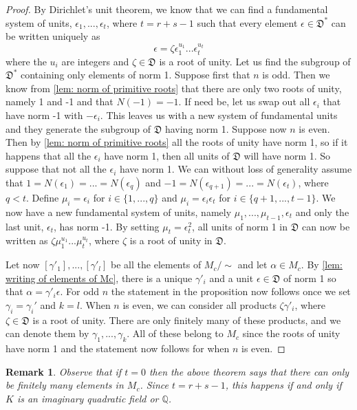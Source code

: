 \documentclass{article}
\newtheorem{remark}{Remark}[section]
\newcommand{\mfrak}[1]{\mathfrak{#1}}
\newcommand{\mbb}[1]{\mathbb{#1}}
\begin{document}
\begin{proof}
    By Dirichlet's unit theorem, we know that we can find a fundamental system of units, $\epsilon_1, ..., \epsilon_t$, where $t = r+s-1$ such that every element $\epsilon \in \mfrak D^*$ can be written uniquely as 
    $$\epsilon = \zeta \epsilon_1^{u_1} ... \epsilon_t^{u_t}$$
    where the $u_i$ are integers and $\zeta \in \mfrak D$ is a root of unity. Let us find the subgroup of $\mfrak D^*$ containing only elements of norm 1. Suppose first that $n$ is odd. Then we know from \cref{lem: norm of primitive roots} that there are only two roots of unity, namely 1 and -1 and that $N(-1) = -1$. If need be, let us swap out all $\epsilon_i$ that have norm -1 with $-\epsilon_i$. This leaves us with a new system of fundamental units and they generate the subgroup of $\mfrak D$ having norm 1. Suppose now $n$ is even. Then by \cref{lem: norm of primitive roots} all the roots of unity have norm 1, so if it happens that all the $\epsilon_i$ have norm 1, then all units of $\mfrak D$ will have norm 1. So suppose that not all the $\epsilon_i$ have norm 1. We can without loss of generality assume that $1 = N(\epsilon_1) = ... = N(\epsilon_q)$ and $-1 = N(\epsilon_{q+1}) = ... = N(\epsilon_t)$, where $q < t$. Define  
    $\mu_i = \epsilon_i$ for $i \in \{1, ..., q\}$ and $\mu_i = \epsilon_i \epsilon_t$ for $i \in \{q+1, ..., t-1\}$. We now have a new fundamental system of units, namely $\mu_1, ..., \mu_{t-1},\epsilon_t$ and only the last unit, $\epsilon_t$, has norm -1. By setting $\mu_t = \epsilon_t^2$, all units of norm 1 in $\mfrak D$ can now be written as $\zeta \mu_1^{u_1}...\mu_t^{u_t}$, where $\zeta$ is a root of unity in $\mfrak D$. 

    Let now $[\gamma'_1], ..., [\gamma'_l]$ be all the elements of $M_c / \sim$ and let $\alpha \in M_c$. By \cref{lem: writing of elements of Mc}, there is a unique $\gamma'_i$ and a unit $\epsilon \in \mfrak D$ of norm 1 so that $\alpha = \gamma'_i \epsilon$. For odd $n$ the statement in the proposition now follows once we set $\gamma_i = \gamma_i'$ and $k = l$. When $n$ is even, we can consider all products $\zeta \gamma'_i$, where $\zeta \in \mfrak D$ is a root of unity. There are only finitely many of these products, and we can denote them by $\gamma_1, ..., \gamma_k$. All of these belong to $M_c$ since the roots of unity have norm 1 and the statement now follows for when $n$ is even.
\end{proof}
\begin{remark}\label{rem: When does a full module have finitely many solutions}
    Observe that if $t = 0$ then the above theorem says that there can only be finitely many elements in $M_c$. Since $t = r + s - 1$, this happens if and only if $K$ is an imaginary quadratic field or $\mbb Q$.    
\end{remark}
\end{document}

